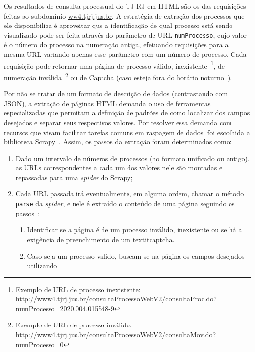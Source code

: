 
Os resultados de consulta processual do TJ-RJ em HTML são os das requisições
feitas ao subdomínio \url{ww4.tjrj.jus.br}. A estratégia de extração dos
processos que ele disponibiliza é aproveitar que a identificação de qual
processo está sendo visualizado pode ser feita através do parâmetro de URL
\texttt{numProcesso}, cujo valor é o número do processo na numeração antiga,
efetuando requisições para a mesma URL variando apenas esse parâmetro com um
número de processo. Cada requisição pode retornar uma página de processo
válido, inexistente~\footnote{Exemplo de URL de processo inexistente:
\url{http://www4.tjrj.jus.br/consultaProcessoWebV2/consultaProc.do?numProcesso=2020.004.015548-9}},
de numeração inválida~\footnote{Exemplo de URL de processo inválido:
\url{http://www4.tjrj.jus.br/consultaProcessoWebV2/consultaMov.do?numProcesso=0}}
ou de Captcha (caso esteja fora do horário noturno~).

Por não se tratar de um formato de descrição de dados (contrastando com JSON),
a extração de páginas HTML demanda o uso de ferramentas especializadas que
permitam a definição de padrões de como localizar dos campos desejados e
separar seus respectivos valores. Por resolver essa demanda com recursos que
visam facilitar tarefas comuns em raspagem de dados, foi escolhida a biblioteca
Scrapy~\cite{lib:scrapy}. Assim, os passos da extração foram determinados como:

\begin{enumerate}
    \item Dado um intervalo de números de processos (no formato unificado ou
        antigo), as URLs correspondentes a cada um dos valores nele são
        montadas e repassadas para uma \textit{spider} do Scrapy;
    \item Cada URL passada irá eventualmente, em alguma ordem, chamar o método
        \texttt{parse} da \textit{spider}, e nele é extraído o conteúdo de uma
        página seguindo os passos~\label{step-1}:

        \begin{enumerate}
            \item Identificar se a página é de um processo inválido,
                inexistente ou se há a exigência de preenchimento de um
                textit{captcha}.
            \item Caso seja um processo válido, buscam-se na página os campos
                desejados utilizando
        \end{enumerate}
\end{enumerate}

